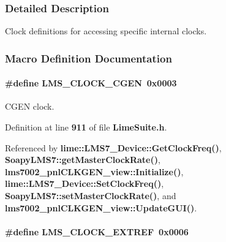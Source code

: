 \subsubsection{Detailed Description}
Clock definitions for accessing specific internal clocks. 



\subsubsection{Macro Definition Documentation}
\paragraph[{L\+M\+S\+\_\+\+C\+L\+O\+C\+K\+\_\+\+C\+G\+EN}]{\setlength{\rightskip}{0pt plus 5cm}\#define L\+M\+S\+\_\+\+C\+L\+O\+C\+K\+\_\+\+C\+G\+EN~0x0003}\label{group__LMS__CLOCK__ID_ga02227f47e9f4bc97f2af1be352cf4324}


C\+G\+EN clock. 



Definition at line {\bf 911} of file {\bf Lime\+Suite.\+h}.



Referenced by {\bf lime\+::\+L\+M\+S7\+\_\+\+Device\+::\+Get\+Clock\+Freq()}, {\bf Soapy\+L\+M\+S7\+::get\+Master\+Clock\+Rate()}, {\bf lms7002\+\_\+pnl\+C\+L\+K\+G\+E\+N\+\_\+view\+::\+Initialize()}, {\bf lime\+::\+L\+M\+S7\+\_\+\+Device\+::\+Set\+Clock\+Freq()}, {\bf Soapy\+L\+M\+S7\+::set\+Master\+Clock\+Rate()}, and {\bf lms7002\+\_\+pnl\+C\+L\+K\+G\+E\+N\+\_\+view\+::\+Update\+G\+U\+I()}.

\paragraph[{L\+M\+S\+\_\+\+C\+L\+O\+C\+K\+\_\+\+E\+X\+T\+R\+EF}]{\setlength{\rightskip}{0pt plus 5cm}\#define L\+M\+S\+\_\+\+C\+L\+O\+C\+K\+\_\+\+E\+X\+T\+R\+EF~0x0006}\label{group__LMS__CLOCK__ID_ga42a37126287b107d0c6f40fbb874cf59}


